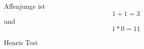 \documentclass[a4paper,12pt]{article}
\begin{document}
Affenjunge ist
\begin{equation}
	1+1=3
\end{equation}
und 
\begin{equation}
	1*0=11
\end{equation}

Henris Test
\end{document}
